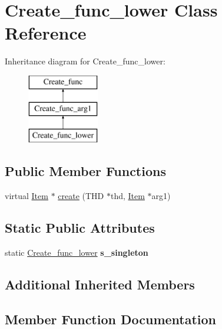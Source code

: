 \hypertarget{classCreate__func__lower}{}\section{Create\+\_\+func\+\_\+lower Class Reference}
\label{classCreate__func__lower}
Inheritance diagram for Create\+\_\+func\+\_\+lower\+:\begin{figure}[H]
\begin{center}
\leavevmode
\includegraphics[height=3.000000cm]{classCreate__func__lower}
\end{center}
\end{figure}
\subsection*{Public Member Functions}
\begin{DoxyCompactItemize}
\item 
virtual \mbox{\hyperlink{classItem}{Item}} $\ast$ \mbox{\hyperlink{classCreate__func__lower_a42f15eb2550b4fd39edae6daea1de782}{create}} (T\+HD $\ast$thd, \mbox{\hyperlink{classItem}{Item}} $\ast$arg1)
\end{DoxyCompactItemize}
\subsection*{Static Public Attributes}
\begin{DoxyCompactItemize}
\item 
\mbox{\label{classCreate__func__lower_a25c79f6438cee32343475aad988562a0}} 
static \mbox{\hyperlink{classCreate__func__lower}{Create\+\_\+func\+\_\+lower}} {\bfseries s\+\_\+singleton}
\end{DoxyCompactItemize}
\subsection*{Additional Inherited Members}


\subsection{Member Function Documentation}
\mbox{\label{classCreate__func__lower_a42f15eb2550b4fd39edae6daea1de782}} 
